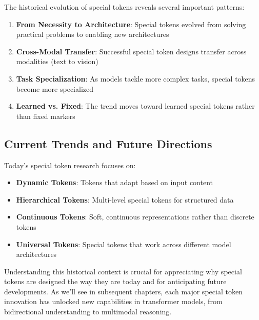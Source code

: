 The historical evolution of special tokens reveals several important patterns:

\begin{principle}
\begin{enumerate}
\item \textbf{From Necessity to Architecture}: Special tokens evolved from solving practical problems to enabling new architectures
\item \textbf{Cross-Modal Transfer}: Successful special token designs transfer across modalities (text to vision)
\item \textbf{Task Specialization}: As models tackle more complex tasks, special tokens become more specialized
\item \textbf{Learned vs. Fixed}: The trend moves toward learned special tokens rather than fixed markers
\end{enumerate}
\end{principle}

\subsection{Current Trends and Future Directions}

Today's special token research focuses on:

\begin{itemize}
\item \textbf{Dynamic Tokens}: Tokens that adapt based on input content
\item \textbf{Hierarchical Tokens}: Multi-level special tokens for structured data
\item \textbf{Continuous Tokens}: Soft, continuous representations rather than discrete tokens
\item \textbf{Universal Tokens}: Special tokens that work across different model architectures
\end{itemize}

Understanding this historical context is crucial for appreciating why special tokens are designed the way they are today and for anticipating future developments. As we'll see in subsequent chapters, each major special token innovation has unlocked new capabilities in transformer models, from bidirectional understanding to multimodal reasoning.